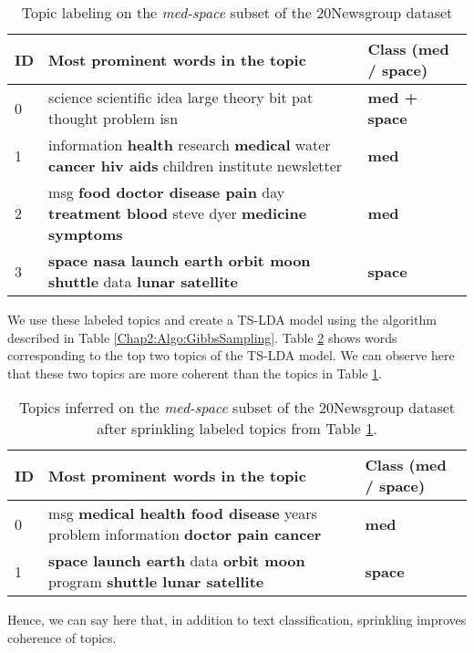 \documentclass[11pt]{article}
\begin{document}
\begin{table}[h]\small
\centering 
\begin{tabular}{|p{0.3cm}|p{4.5cm}|p{1.5cm}|}
\hline
\textbf{ID} & \textbf{Most prominent words in the topic} & \textbf{Class (med / space)} \tabularnewline \hline
0	&	science scientific idea large theory bit pat thought problem isn  	&	\textbf{med + space}	\tabularnewline \hline
1	&	information \textbf{health} research \textbf{medical} water \textbf{cancer hiv aids} children institute newsletter  &	\textbf{med}	\tabularnewline \hline
2	&	msg \textbf{food doctor disease pain} day \textbf{treatment blood} steve dyer \textbf{medicine symptoms}  &	\textbf{med}	\tabularnewline \hline
3	&	\textbf{space nasa launch earth orbit moon shuttle} data \textbf{lunar satellite}  &	\textbf{space}	\tabularnewline \hline
\end{tabular}\caption{\small{Topic labeling on the \textit{med-space} subset of the 20Newsgroup dataset}}
\label{Example_topics_ms} 
\end{table}
We use these labeled topics and create a TS-LDA model using the algorithm described in Table \ref{Chap2:Algo:GibbsSampling}. Table \ref{Example_topics_ms_sp} shows words corresponding to the top two topics of the TS-LDA model. We can observe here that these two topics are more coherent than the topics in Table \ref{Example_topics_ms}.
\begin{table}[h]\small
\centering 
\begin{tabular}{|p{0.3cm}|p{4.5cm}|p{1.5cm}|}
\hline
\textbf{ID} & \textbf{Most prominent words in the topic} & \textbf{Class (med / space)} \tabularnewline \hline
0	&	msg \textbf{medical health food disease} years problem information \textbf{doctor pain cancer}  	&	\textbf{med}	\tabularnewline \hline
1	&	\textbf{space launch earth} data \textbf{orbit moon} program \textbf{shuttle lunar satellite}  &	\textbf{space}	\tabularnewline \hline
\end{tabular}\caption{\small{Topics inferred on the \textit{med-space} subset of the 20Newsgroup dataset after sprinkling labeled topics from Table \ref{Example_topics_ms}.}}
\label{Example_topics_ms_sp} 
\end{table}

Hence, we can say here that, in addition to text classification, sprinkling improves coherence of topics.
\end{document}
